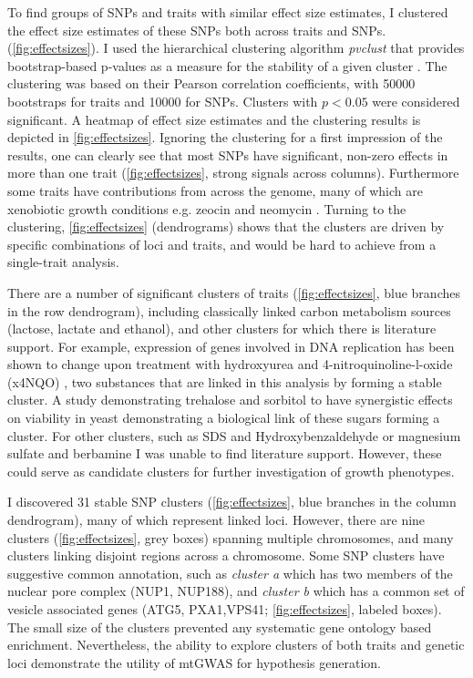 To find groups of SNPs and traits with similar effect size estimates, I clustered the effect size estimates of these SNPs both across traits and SNPs. (\cref{fig:effectsizes}). I used the hierarchical clustering algorithm \textit{pvclust} that provides bootstrap-based p-values as a measure for the stability of a given cluster \citep{Suzuki2006}. The clustering was based on their Pearson correlation coefficients, with \num{50000} bootstraps for traits and \num{10000} for SNPs. Clusters with \(p < 0.05\) were considered significant. A heatmap of effect size estimates and the clustering results is depicted in \cref{fig:effectsizes}. Ignoring the clustering for a first impression of the results, one can clearly see that most SNPs have significant, non-zero effects in more than one trait (\cref{fig:effectsizes}, strong signals across columns). Furthermore some traits have contributions from across the genome, many of which are xenobiotic growth conditions e.g. zeocin \citep{Krol2015} and neomycin \citep{Foiani2010}. Turning to the clustering, \cref{fig:effectsizes} (dendrograms) shows that the clusters are driven by specific combinations of loci and traits, and would be hard to achieve from a single-trait analysis. 

There are a number of significant clusters of traits (\cref{fig:effectsizes}, blue branches in the row dendrogram), including classically linked carbon metabolism sources (lactose, lactate and ethanol), and other clusters for which there is literature support. For example, expression of genes involved in DNA replication has been shown to change upon treatment with hydroxyurea and \num{4}-nitroquinoline-l-oxide (x4NQO) \citep{Elledge1990}, two substances that are linked in this analysis by forming a stable cluster. A study demonstrating trehalose and sorbitol to have synergistic effects on viability in yeast \citep{Hua2015} demonstrating a biological link of these sugars forming a cluster. For other clusters, such as SDS and Hydroxybenzaldehyde or magnesium sulfate and berbamine I was unable to find literature support. However, these could serve as candidate clusters for further investigation of growth phenotypes.

I discovered \num{31} stable SNP clusters (\cref{fig:effectsizes}, blue branches in the column dendrogram), many of which represent linked loci. However, there are nine clusters (\cref{fig:effectsizes}, grey boxes) spanning multiple chromosomes, and many clusters linking disjoint regions across a chromosome. Some SNP clusters have suggestive common annotation, such as \textit{cluster a} which has two members of the nuclear pore complex (NUP1, NUP188), and \textit{cluster b} which has a common set of vesicle associated genes (ATG5, PXA1,VPS41; \cref{fig:effectsizes}, labeled boxes). The small size of the clusters prevented any systematic gene ontology based enrichment. Nevertheless, the ability to explore clusters of both traits and genetic loci demonstrate the utility of mtGWAS for hypothesis generation.

